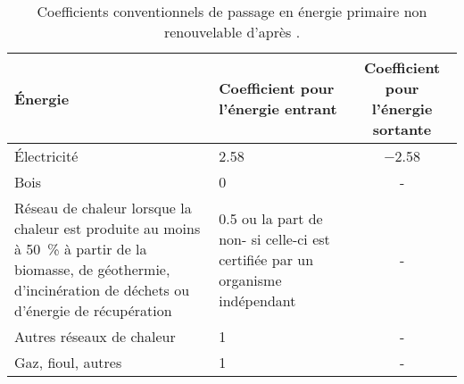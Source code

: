 
\begin{table}
\centering
\caption[Coefficients conventionnels de passage en énergie primaire non renouvelable]
         {Coefficients conventionnels de passage en énergie primaire non renouvelable
          d’après \textcite{Effinergie2015}.}
\label{tab:coef_finale_primaire}
\begin{tabular}{L{5cm} C{5cm} c}
    \toprule
    Énergie                   & Coefficient pour l’énergie entrant                      & Coefficient pour l’énergie sortante \\
    \midrule
    Électricité               & \num{2.58}                                              & \num{-2.58}                         \\
    Bois                      & \num{0}                                                 & -                                   \\
    Réseau de chaleur lorsque la chaleur est produite au moins à \SI{50}{\percent} à partir
    de la biomasse, de géothermie, d’incinération de déchets ou d’énergie de
    récupération              & \num{0.5} ou la part de non- si celle-ci est
                                certifiée par un organisme indépendant                  & -                                   \\
    Autres réseaux de chaleur & \num{1}                                                 & -                                   \\
    Gaz, fioul, autres        &  \num{1}                                                & -                                   \\
    \bottomrule
\end{tabular}
\end{table}
